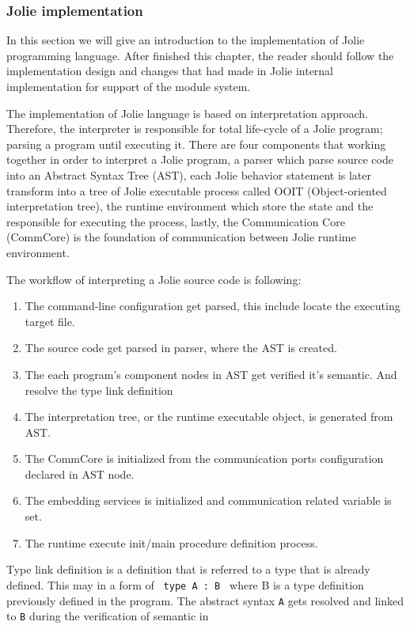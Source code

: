 \subsubsection{Jolie implementation}

In this section we will give an introduction to the implementation of Jolie programming language. After finished this chapter, the reader should follow the implementation design and changes that had made in Jolie internal implementation for support of the module system.

The implementation of Jolie language is based on interpretation approach. Therefore, the interpreter is responsible for total life-cycle of a Jolie program; parsing a program until executing it. There are four components that working together in order to interpret a Jolie program, a parser which parse source code into an Abstract Syntax Tree (AST), each Jolie behavior statement is later transform into a tree of Jolie executable process called OOIT (Object-oriented interpretation tree), the runtime environment which store the state and the responsible for executing the process, lastly, the Communication Core (CommCore) is the foundation of communication between Jolie runtime environment.

The workflow of interpreting a Jolie source code is following:

\begin{enumerate}
    \item The command-line configuration get parsed, this include locate the executing target file.
    \item The source code get parsed in parser, where the AST is created.
    \item The each program's component nodes in AST get verified it's semantic. And resolve the type link definition
    \item The interpretation tree, or the runtime executable object, is generated from AST.
    \item The CommCore is initialized from the communication ports configuration declared in AST node.
    \item The embedding services is initialized and communication related variable is set.
    \item The runtime execute init/main procedure definition process.
\end{enumerate}

Type link definition is a definition that is referred to a type that is already defined. This may in a form of \lstinline{ type A : B } where B is a type definition previously defined in the program. The abstract syntax \texttt{A} gets resolved and linked to \texttt{B} during the verification of semantic in  



